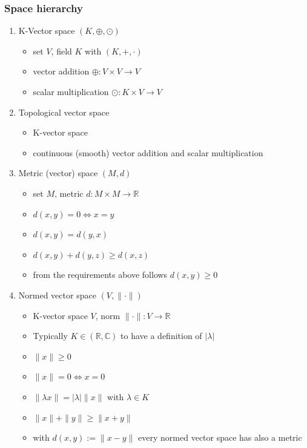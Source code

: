 \documentclass[10pt,a4paper]{article}
\theoremstyle{definition}
\begin{document}
\subsubsection{Space hierarchy}
\begin{enumerate}
    \item K-Vector space $(K,\oplus,\odot)$ 
        \begin{itemize}
            \item set $V$, field $K$ with $(K,+,\cdot)$
            \item vector addition $\oplus: V\times V\rightarrow V$
            \item scalar multiplication $\odot: K\times V\rightarrow V$
        \end{itemize}
    \item Topological vector space
        \begin{itemize}
            \item K-vector space
            \item continuous (smooth) vector addition and scalar multiplication
        \end{itemize}
    \item Metric (vector) space $(M,d)$
        \begin{itemize}
            \item set $M$, metric $d: M\times M\rightarrow \mathbb{R}$
            \item $d(x,y)=0 \Leftrightarrow x=y$
            \item $d(x,y)=d(y,x)$
            \item $d(x,y)+d(y,z) \ge d(x,z)$
            \item from the requirements above follows $d(x,y)\ge0$
        \end{itemize}
    \item Normed vector space $(V,\|\cdot\|)$
        \begin{itemize}
            \item K-vector space $V$, norm $\|\cdot\|: V\rightarrow \mathbb{R}$
            \item Typically $K\in(\mathbb{R}, \mathbb{C})$ to have a definition of $|\lambda|$
            \item $\|x\|\ge0$
            \item $\|x\|=0 \Leftrightarrow x=0$
            \item $\|\lambda x\|=|\lambda| \|x\|$ with $\lambda\in K$
            \item $\|x\|+\|y\|\ge\|x+y\|$
            \item with $d(x,y):=\|x-y\|$ every normed vector space has also a metric

\end{itemize}
\end{enumerate}
\end{document}
